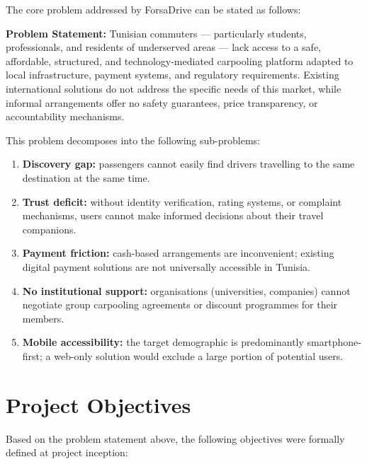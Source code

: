 \documentclass[12pt,a4paper,openright]{report}
\begin{document}
The core problem addressed by ForsaDrive can be stated as follows:

\begin{mdframed}[backgroundcolor=fdnavy!5, linecolor=fdnavy, linewidth=1.5pt, leftmargin=0.5cm, rightmargin=0.5cm]
\textbf{Problem Statement:} Tunisian commuters — particularly students, professionals, and residents of underserved areas — lack access to a safe, affordable, structured, and technology-mediated carpooling platform adapted to local infrastructure, payment systems, and regulatory requirements. Existing international solutions do not address the specific needs of this market, while informal arrangements offer no safety guarantees, price transparency, or accountability mechanisms.
\end{mdframed}

\vspace{0.5cm}

This problem decomposes into the following sub-problems:

\begin{enumerate}[noitemsep]
    \item \textbf{Discovery gap:} passengers cannot easily find drivers travelling to the same destination at the same time.
    \item \textbf{Trust deficit:} without identity verification, rating systems, or complaint mechanisms, users cannot make informed decisions about their travel companions.
    \item \textbf{Payment friction:} cash-based arrangements are inconvenient; existing digital payment solutions are not universally accessible in Tunisia.
    \item \textbf{No institutional support:} organisations (universities, companies) cannot negotiate group carpooling agreements or discount programmes for their members.
    \item \textbf{Mobile accessibility:} the target demographic is predominantly smartphone-first; a web-only solution would exclude a large portion of potential users.
\end{enumerate}

\section{Project Objectives}

Based on the problem statement above, the following objectives were formally defined at project inception:
\end{document}

